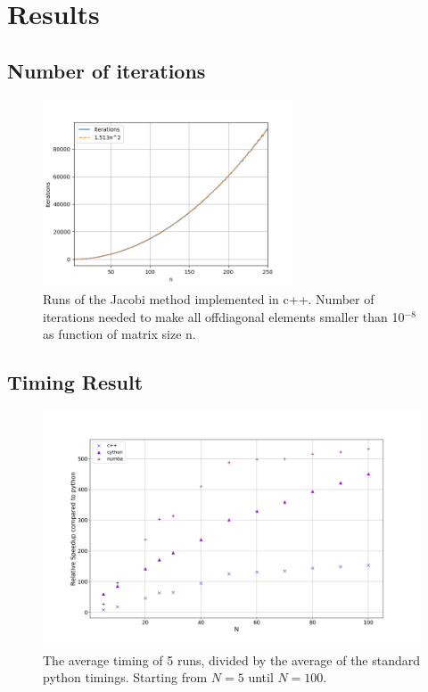 \section{Results}


\subsection{Number of iterations}

\begin{figure}[H]
  \centering
  \includegraphics[width=0.66\textwidth]{../figures/iterations.png}

  \caption{Runs of the Jacobi method implemented in c++. Number of iterations
  needed to make all offdiagonal elements smaller than 10$^{-8}$ as function of
  matrix size n.}

  \label{fig:iterations}
\end{figure}

\subsection{Timing Result}

\begin{figure}[H]
  \centering
  \includegraphics[width=1.0\textwidth]{../figures/avgspeed.png}
  \caption{ The average timing of 5 runs, divided by the average of the standard
  python timings. Starting from $N=5$ until $N=100$. }
  \label{fig:comp_python}
\end{figure}

